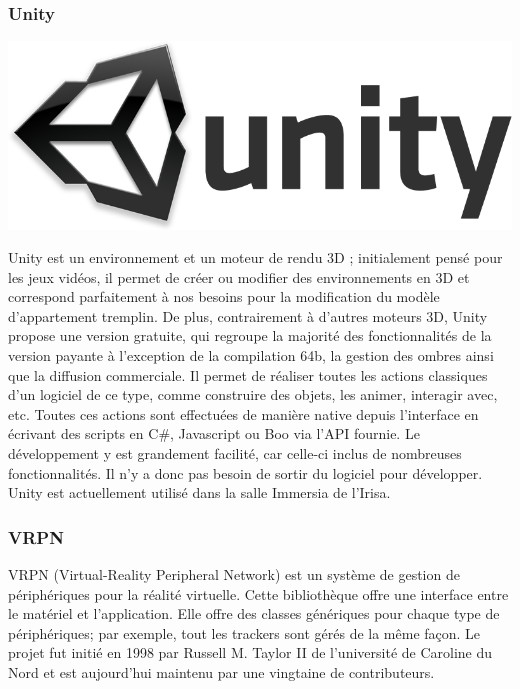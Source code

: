 	
	\subsubsection{Unity}
		\noindent\begin{minipage}{0.3\textwidth}
			\includegraphics[width=\linewidth]{1-PreEtude/img/unity_logo}
			\end{minipage}
			\hfill
			\begin{minipage}{0.6\textwidth}\raggedleft
			Unity est un environnement et un moteur de rendu 3D ; initialement pensé pour les jeux vidéos, il permet de créer ou modifier des environnements en 3D et correspond parfaitement à nos besoins pour la modification du modèle d’appartement tremplin.
			De plus, contrairement à d’autres moteurs 3D, Unity propose une version gratuite, qui regroupe la majorité des fonctionnalités de la version payante à l'exception de la compilation 64b, la gestion des ombres ainsi que la diffusion commerciale.
			Il permet de réaliser toutes les actions classiques d'un logiciel de ce type, comme construire des objets, les animer, interagir avec, etc. Toutes ces actions sont effectuées de manière native depuis l'interface en écrivant des scripts en C\#, Javascript ou Boo via l'API fournie.
			Le développement y est grandement facilité, car celle-ci inclus de nombreuses fonctionnalités. Il n'y a donc pas besoin de sortir du logiciel pour développer.
			Unity est actuellement utilisé dans la salle Immersia de l’Irisa.
		\end{minipage}
		      

	\subsubsection{VRPN}
	
		VRPN (Virtual-Reality Peripheral Network) est un système de gestion de périphériques pour la réalité virtuelle. Cette bibliothèque offre une interface entre le matériel et l'application. Elle offre des classes génériques pour chaque type de périphériques; par exemple, tout les trackers sont gérés de la même façon.
		Le projet fut initié en 1998 par Russell M. Taylor II de l'université de Caroline du Nord et est aujourd'hui maintenu par une vingtaine de contributeurs.
	
